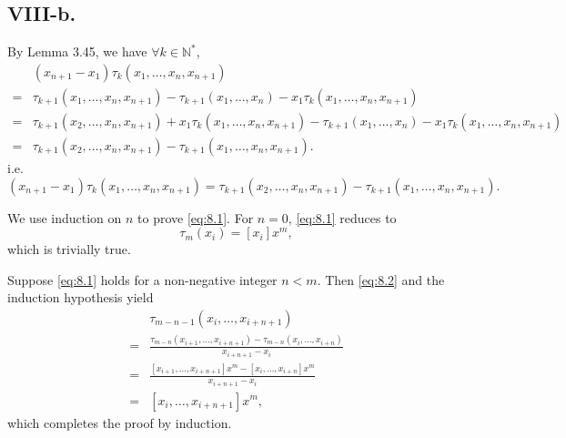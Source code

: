 \documentclass[a4paper]{article}
\begin{document}
\subsection*{VIII-b.}
By Lemma 3.45, we have $\forall k\in \mathbb{N}^{*}$, 
$$
\begin{aligned}
  &(x_{n+1}-x_{1})\tau_{k}(x_{1},\ldots,x_{n},x_{n+1})\\
  =&\tau_{k+1}(x_{1},\ldots,x_{n},x_{n+1})-\tau_{k+1}(x_{1},\ldots,x_{n})-x_{1}\tau_{k}(x_{1},\ldots,x_{n},x_{n+1})\\
  =&\tau_{k+1}(x_{2},\ldots,x_{n},x_{n+1})+x_{1}\tau_{k}(x_{1},\ldots,x_{n},x_{n+1})-\tau_{k+1}(x_{1},\ldots,x_{n})-x_{1}\tau_{k}(x_{1},\ldots,x_{n},x_{n+1})\\
  =&\tau_{k+1}(x_{2},\ldots,x_{n},x_{n+1})-\tau_{k+1}(x_{1},\ldots,x_{n},x_{n+1}).
\end{aligned}
$$
i.e. 
\begin{equation} \label{eq:8.2}
  (x_{n+1}-x_{1})\tau_{k}(x_{1},\ldots,x_{n},x_{n+1}) = \tau_{k+1}(x_{2},\ldots,x_{n},x_{n+1}) - \tau_{k+1}(x_{1},\ldots,x_{n},x_{n+1}).
\end{equation}

We use induction on $n$ to prove \eqref{eq:8.1}. For $n=0$, \eqref{eq:8.1} reduces to 
$$
\tau_{m}(x_i)=[x_i]x^m,
$$
which is trivially true.

Suppose \eqref{eq:8.1} holds for a non-negative integer $n<m$. Then \eqref{eq:8.2} and the induction hypothesis yield 
$$
\begin{aligned}
  &\tau_{m-n-1}(x_{i},\ldots,x_{i+n+1})\\
  =&\frac{\tau_{m-n}(x_{i+1},\ldots,x_{i+n+1})-\tau_{m-n}(x_{i},\ldots,x_{i+n})}{x_{i+n+1}-x_{i}}\\
  =&\frac{[x_{i+1},\ldots,x_{i+n+1}]x^{m}-[x_{i},\ldots,x_{i+n}]x^{m}}{x_{i+n+1}-x_{i}}\\
  =&[x_{i},\ldots,x_{i+n+1}]x^{m},
\end{aligned}
$$
which completes the proof by induction.
\end{document}
